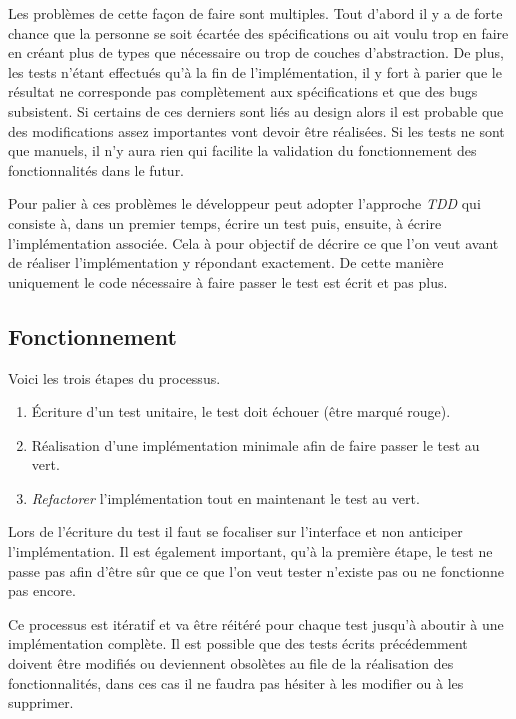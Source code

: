 \documentclass[journal, a4paper, frenchb]{IEEEtran}
\begin{document}
Les problèmes de cette façon de faire sont multiples. Tout d'abord il y a de forte chance que la personne se soit écartée des spécifications ou ait voulu trop en faire en créant plus de types que nécessaire ou trop de couches d'abstraction. De plus, les tests n'étant effectués qu'à la fin de l'implémentation, il y fort à parier que le résultat ne corresponde pas complètement aux spécifications et que des bugs subsistent. Si certains de ces derniers sont liés au design alors il est probable que des modifications assez importantes vont devoir être réalisées. Si les tests ne sont que manuels, il n'y aura rien qui facilite la validation du fonctionnement des fonctionnalités dans le futur.

Pour palier à ces problèmes le développeur peut adopter l'approche \emph{TDD} qui consiste à, dans un premier temps, écrire un test puis, ensuite, à écrire l'implémentation associée. Cela à pour objectif de décrire ce que l'on veut avant de réaliser l'implémentation y répondant exactement. De cette manière uniquement le code nécessaire à faire passer le test est écrit et pas plus.


\subsection{Fonctionnement}

Voici les trois étapes du processus.

\begin{enumerate}
   \item Écriture d'un test unitaire, le test doit échouer (être marqué rouge).
   \item Réalisation d'une implémentation minimale afin de faire passer le test au vert.
   \item \emph{Refactorer} l'implémentation tout en maintenant le test au vert.
\end{enumerate}

Lors de l'écriture du test il faut se focaliser sur l'interface et non anticiper l'implémentation. Il est également important, qu'à la première étape, le test ne passe pas afin d'être sûr que ce que l'on veut tester n'existe pas ou ne fonctionne pas encore.

Ce processus est itératif et va être réitéré pour chaque test jusqu'à aboutir à une implémentation complète. Il est possible que des tests écrits précédemment doivent être modifiés ou deviennent obsolètes au file de la réalisation des fonctionnalités, dans ces cas il ne faudra pas hésiter à les modifier ou à les supprimer.
\end{document}
